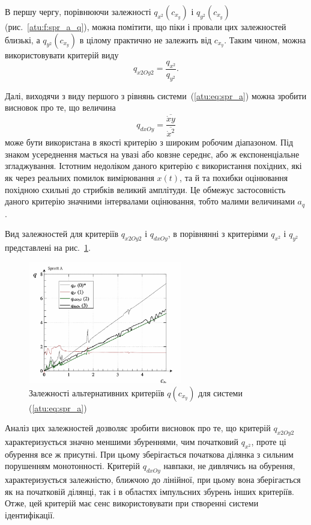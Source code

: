 В першу чергу, порівнюючи залежності
$q_{x^2}(c_{x_y})$ і
$q_{y^2}(c_{x_y})$ (рис.~\ref{atu:f:spr_a_q}), можна помітити, що піки і провали
цих залежностей близькі, а
$q_{y^2} (c_{x_y})$ в цілому практично не залежить від
$c_{x_y}$. Таким чином, можна використовувати критерій виду
%
\[
  q_{x2Oy2} = \frac{q_{x^2}}{q_{y^2}}.
\]

Далі, виходячи з виду першого з рівнянь системи~(\ref{atu:eq:spr_a})
можна зробити висновок про те, що величина
%
\begin{equation}
  q_{dxOy} =
  \frac{\overline{\dot{x}y}}{\overline{\dot{x}^2}}
  \label{atu:eq:spr_a_q_dxyOdx2}
\end{equation}
%
може бути використана в якості критерію з широким робочим
діапазоном. Під знаком усереднення мається на увазі або ковзне
середнє, або ж експоненціальне згладжування. Істотним недоліком
даного критерію є використання похідних, які як через реальних
помилок вимірювання
$x(t)$, та й та похибки оцінювання похідною схильні до стрибків
великий амплітуди. Це обмежує застосовність даного критерію
значними інтервалами оцінювання, тобто малими величинами
$a_q$.

Вид залежностей для критеріїв
$q_{x2Oy2}$ і
$q_{dxOy}$, в порівнянні з критеріями
$q_{x^2}$ і
$q_{y^2}$ представлені на рис.~\ref{atu:f:spr_a_q_alt}.

\begin{figure}[htb!]
\begin{center}
  \includegraphics[width=0.60\textwidth]{p/cha/spr_a/sprott_a_q2-p_c_x_y2.png}
\end{center}
\caption{Залежності альтернативних критеріїв $q (c_{x_y})$ для системи (\ref{atu:eq:spr_a})}
\label{atu:f:spr_a_q_alt}
\end{figure}

Аналіз цих залежностей дозволяє зробити висновок про те, що
критерій
$q_{x2Oy2}$ характеризується значно меншими збуреннями, чим
початковий
$q_{x^2}$, проте ці обурення все ж присутні. При цьому зберігається
початкова ділянка з сильним порушенням монотонності. Критерій
$q_{dxOy}$ навпаки, не дивлячись на обурення, характеризується
залежністю, ближчою до лінійної, при цьому вона зберігається
як на початковій ділянці, так і в областях імпульсних збурень
інших критеріїв. Отже, цей критерій має сенс використовувати
при створенні системи ідентифікації.

